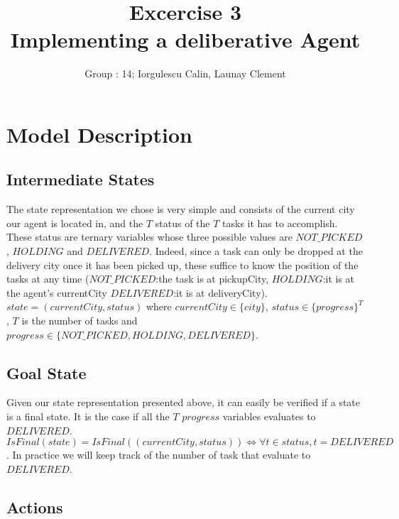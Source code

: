 \documentclass[11pt]{article}
\title{\bf Excercise 3\\ Implementing a deliberative Agent}
\author{Group \textnumero : 14; Iorgulescu Calin, Launay Clement}
\begin{document}
\maketitle

\section{Model Description}

\subsection{Intermediate States}

The state representation we chose is very simple and consists of the current city our agent is located in, and the $T$ status of the $T$ tasks it has to accomplish. These status are ternary variables whose three possible values are $NOT\_PICKED$, $HOLDING$ and $DELIVERED$. Indeed, since a task can only be dropped at the delivery city once it has been picked up, these suffice to know the position of the tasks at any time ($NOT\_PICKED$:the task is at pickupCity, $HOLDING$:it is at the agent's currentCity $DELIVERED$:it is at deliveryCity).
$state = (currentCity, status)$ where $currentCity \in \{city\}$, $status \in \{progress\}^T$, $T$ is the number of tasks and $progress \in \{NOT\_PICKED, HOLDING, DELIVERED\}$.

\subsection{Goal State}

Given our state representation presented above, it can easily be verified if a state is a final state. It is the case if all the $T$ $progress$ variables evaluates to $DELIVERED$. \\
$IsFinal(state) = IsFinal((currentCity, status)) \Longleftrightarrow \forall t \in status, t=DELIVERED$.
In practice we will keep track of the number of task that evaluate to $DELIVERED$. 

\subsection{Actions}
\end{document}
